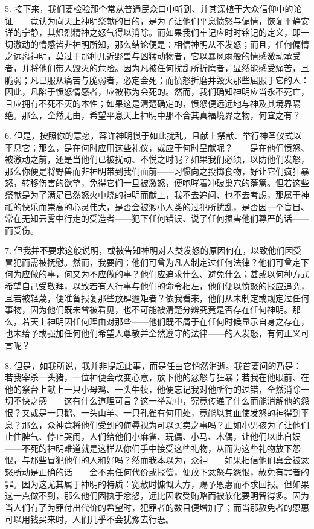 5. 接下来，我们要检验那个常从普通民众口中听到、并其深植于大众信仰中的论证——竟认为向天上神明祭献的目的，是为了让他们平息愤怒与偏情，恢复平静安详的宁静，其炽烈精神之怒气得以消除。而如果我们牢记应时时铭记的定义，即一切激动的情感皆非神明所知，那么结论便是：相信神明从不发怒；而且，任何偏情之远离神明，莫过于那种几近野兽与凶猛动物者，它以暴风雨般的情感激动承受者，并将他们带入毁灭的危险。因为凡被任何扰乱所折磨者，显然能感受痛苦，且脆弱；凡已服从痛苦与脆弱者，必定会死；而愤怒折磨并毁灭那些屈服于它的人：因此，凡陷于愤怒情感者，应被称为会死的。然而，我们确知神明应当永不死亡，且应拥有不死不灭的本性；如果这是清楚确定的，愤怒便远远地与神及其境界隔绝。那么，全然无由，希望平息天上神明中那不合其真福境界之物，何宜之有？\par

6. 但是，按照你的意愿，容许神明惯于如此扰乱，且献上祭献、举行神圣仪式以平息它；那么，是在何时应用这些礼仪，或应于何时呈献呢？——是在他们愤怒、被激动之前，还是当他们已被扰动、不悦之时呢？如果我们必须，以防他们发怒，那么你便是将野兽而非神明带到我们面前——习惯向之投掷食物，好让它们疯狂暴怒，转移伤害的欲望，免得它们一旦被激怒，便咆哮着冲破巢穴的藩篱。但若这些祭献是为了满足已然怒火中烧的神明而献上，我不去追问、也不去考虑，那属于神祇的快乐而崇高的心灵伟大，是否会被渺小人类的过犯所扰乱，是否因一个盲目、常在无知云雾中行走的受造者——犯下任何错误、说了任何损害他们尊严的话——而受伤。\par

7. 但我并不要求这般说明，或被告知神明对人类发怒的原因何在，以致他们因受冒犯而需被抚慰。然而，我要问：他们可曾为凡人制定过任何法律？他们可曾定下何为应做的事，何又为不应做的事？他们应追求什么、避免什么；甚或以何种方式希望自己受敬拜，以致若有人行事与他们的命令相左，他们便以愤怒的报应追究，且若被轻蔑，便准备报复那些放肆逾矩者？依我看来，他们从未制定或规定过任何事物，因为他们既未曾被看见，也不可能被清楚分辨究竟是否存在任何神明。那么，若天上神明因任何理由对那些——他们既不屑于在任何时候显示自身之存在，也未给予或强加任何他们希望人尊敬并全然遵守的法律——的人发怒，有何正义可言呢？\par

8. 但是，如我所说，我并非提起此事，而是任由它悄然消逝。我首要问的乃是：若我宰杀一头猪，一位神便会改变心意，放下他的忿怒与狂暴；若我在他眼前、在他的祭台上献上一只小母鸡、一头牛犊，他便忘记我对他所行的过错，全然消除一切不快之感——这有什么道理可言？这一举动中，究竟传递了什么而能消解他的怨恨？又或是一只鹅、一头山羊、一只孔雀有何用处，竟能以其血使发怒的神得到平息？那么，众神竟将他们受到的侮辱视为可以买卖之事吗？正如小男孩为了让他们止住脾气、停止哭闹，人们给他们小麻雀、玩偶、小马、木偶，让他们以此自娱——不死的神明难道就是这样从你们手中接受这些礼物，从而为这些礼物放下怨恨，与那些冒犯他们的人和好吗？然而我本以为，众神——如果相信他们真会被忿怒所动是正确的话——会不索任何代价或报偿，便放下忿怒与怨恨，赦免有罪者的罪。因为这尤其属于神明的特质：宽赦时慷慨大方，赐予恩惠而不求回报。但如果这一点做不到，那么他们固执于忿怒，远比因收受贿赂而被软化要明智得多。因为当人们有了为罪付出代价的希望时，犯罪者的数目便增加了；而当那赦免者的恩惠可以用钱买来时，人们几乎不会犹豫去行恶。\par


